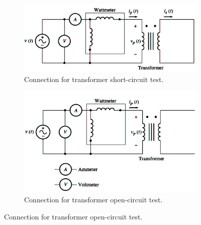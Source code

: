 \documentclass[a4paper,12pt]{article}
\begin{document}
	
	\begin{figure}[H]
		\centering
		\begin{subfigure}[t]{1\textwidth}
			\centering
			\includegraphics[width=0.8\linewidth]{Images/sc}
			\caption{Connection for transformer short-circuit test.}
			\vspace{0.5cm}
		\end{subfigure}
		
		\begin{subfigure}[t]{1\textwidth}
			\centering
			\includegraphics[width=0.75\linewidth]{Images/oc}
			\caption{ Connection for transformer open-circuit test. }
		\end{subfigure}
		
		
	\end{figure}
	
	
	\newpage
	
	
\end{document}
